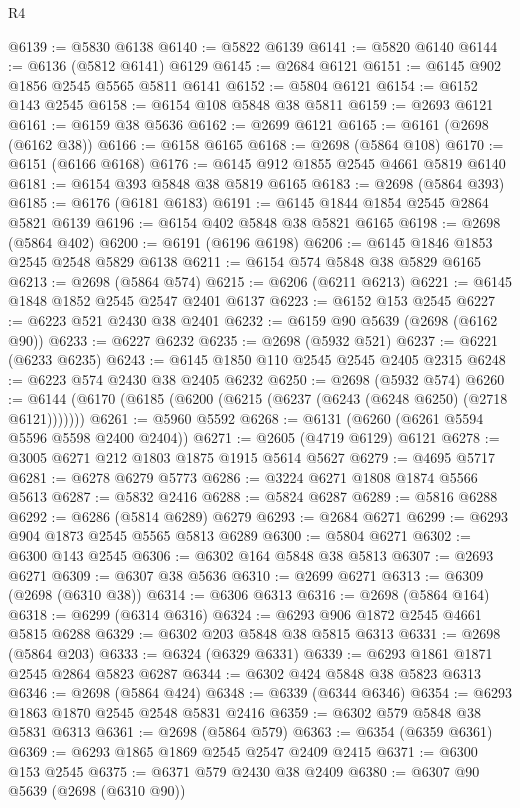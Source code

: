 \begin{lexlean}{R4}
\begin{coremodule}
@6139 := @5830 @6138
@6140 := @5822 @6139
@6141 := @5820 @6140
@6144 := @6136 (@5812 @6141) @6129
@6145 := @2684 @6121
@6151 := @6145 @902 @1856 @2545 @5565 @5811 @6141
@6152 := @5804 @6121
@6154 := @6152 @143 @2545
@6158 := @6154 @108 @5848 @38 @5811
@6159 := @2693 @6121
@6161 := @6159 @38 @5636
@6162 := @2699 @6121
@6165 := @6161 (@2698 (@6162 @38))
@6166 := @6158 @6165
@6168 := @2698 (@5864 @108)
@6170 := @6151 (@6166 @6168)
@6176 := @6145 @912 @1855 @2545 @4661 @5819 @6140
@6181 := @6154 @393 @5848 @38 @5819 @6165
@6183 := @2698 (@5864 @393)
@6185 := @6176 (@6181 @6183)
@6191 := @6145 @1844 @1854 @2545 @2864 @5821 @6139
@6196 := @6154 @402 @5848 @38 @5821 @6165
@6198 := @2698 (@5864 @402)
@6200 := @6191 (@6196 @6198)
@6206 := @6145 @1846 @1853 @2545 @2548 @5829 @6138
@6211 := @6154 @574 @5848 @38 @5829 @6165
@6213 := @2698 (@5864 @574)
@6215 := @6206 (@6211 @6213)
@6221 := @6145 @1848 @1852 @2545 @2547 @2401 @6137
@6223 := @6152 @153 @2545
@6227 := @6223 @521 @2430 @38 @2401
@6232 := @6159 @90 @5639 (@2698 (@6162 @90))
@6233 := @6227 @6232
@6235 := @2698 (@5932 @521)
@6237 := @6221 (@6233 @6235)
@6243 := @6145 @1850 @110 @2545 @2545 @2405 @2315
@6248 := @6223 @574 @2430 @38 @2405 @6232
@6250 := @2698 (@5932 @574)
@6260 := @6144 (@6170 (@6185 (@6200 (@6215 (@6237 (@6243 (@6248 @6250) (@2718 @6121)))))))
@6261 := @5960 @5592
@6268 := @6131 (@6260 (@6261 @5594 @5596 @5598 @2400 @2404))
@6271 := @2605 (@4719 @6129) @6121
@6278 := @3005 @6271 @212 @1803 @1875 @1915 @5614 @5627
@6279 := @4695 @5717
@6281 := @6278 @6279 @5773
@6286 := @3224 @6271 @1808 @1874 @5566 @5613
@6287 := @5832 @2416
@6288 := @5824 @6287
@6289 := @5816 @6288
@6292 := @6286 (@5814 @6289) @6279
@6293 := @2684 @6271
@6299 := @6293 @904 @1873 @2545 @5565 @5813 @6289
@6300 := @5804 @6271
@6302 := @6300 @143 @2545
@6306 := @6302 @164 @5848 @38 @5813
@6307 := @2693 @6271
@6309 := @6307 @38 @5636
@6310 := @2699 @6271
@6313 := @6309 (@2698 (@6310 @38))
@6314 := @6306 @6313
@6316 := @2698 (@5864 @164)
@6318 := @6299 (@6314 @6316)
@6324 := @6293 @906 @1872 @2545 @4661 @5815 @6288
@6329 := @6302 @203 @5848 @38 @5815 @6313
@6331 := @2698 (@5864 @203)
@6333 := @6324 (@6329 @6331)
@6339 := @6293 @1861 @1871 @2545 @2864 @5823 @6287
@6344 := @6302 @424 @5848 @38 @5823 @6313
@6346 := @2698 (@5864 @424)
@6348 := @6339 (@6344 @6346)
@6354 := @6293 @1863 @1870 @2545 @2548 @5831 @2416
@6359 := @6302 @579 @5848 @38 @5831 @6313
@6361 := @2698 (@5864 @579)
@6363 := @6354 (@6359 @6361)
@6369 := @6293 @1865 @1869 @2545 @2547 @2409 @2415
@6371 := @6300 @153 @2545
@6375 := @6371 @579 @2430 @38 @2409
@6380 := @6307 @90 @5639 (@2698 (@6310 @90))

\end{coremodule}
\end{lexlean}
